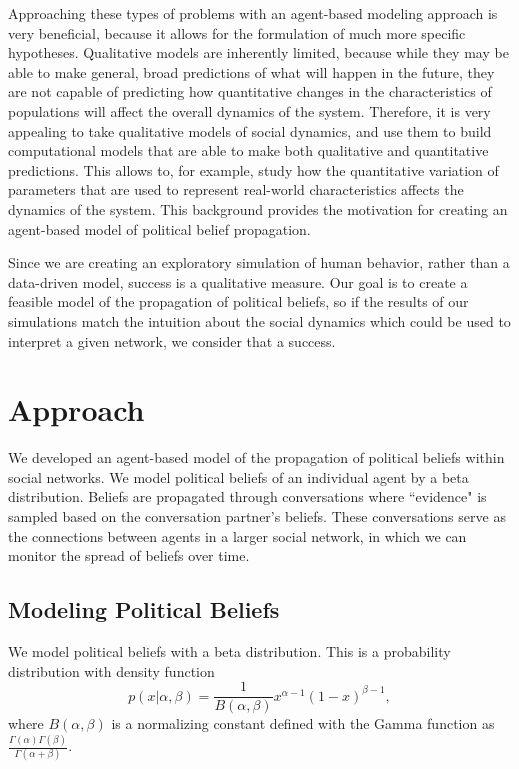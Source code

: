 \documentclass[11pt]{article}
\begin{document}
Approaching these types of problems with an agent-based modeling approach is very beneficial, because it allows for the formulation of much more specific hypotheses. Qualitative models are inherently limited, because while they may be able to make general, broad predictions of what will happen in the future, they are not capable of predicting how quantitative changes in the characteristics of populations will affect the overall dynamics of the system. Therefore, it is very appealing to take qualitative models of social dynamics, and use them to build computational models that are able to make both qualitative and quantitative predictions. This allows to, for example, study how the quantitative variation of parameters that are used to represent real-world characteristics affects the dynamics of the system. This background provides the motivation for creating an agent-based model of political belief propagation.

Since we are creating an exploratory simulation of human behavior, rather than a data-driven model, success is a qualitative measure. Our goal is to create a feasible model of the propagation of political beliefs, so if the results of our simulations match the intuition about the social dynamics which could be used to interpret a given network, we consider that a success.

\section{Approach}

We developed an agent-based model of the propagation of political beliefs within social networks. We model political beliefs of an individual agent by a beta distribution. Beliefs are propagated through conversations where ``evidence" is sampled based on the conversation partner's beliefs. These conversations serve as the connections between agents in a larger social network, in which we can monitor the spread of beliefs over time.

\subsection{Modeling Political Beliefs}

We model political beliefs with a beta distribution. This is a probability distribution with density function \[p(x|\alpha, \beta) = \frac{1}{B(\alpha, \beta)}x^{\alpha-1}(1-x)^{\beta-1},\] where \(B(\alpha,\beta)\) is a normalizing constant defined with the Gamma function as \(\frac{\Gamma(\alpha)\Gamma(\beta)}{\Gamma(\alpha+\beta)}.\)
\end{document}
